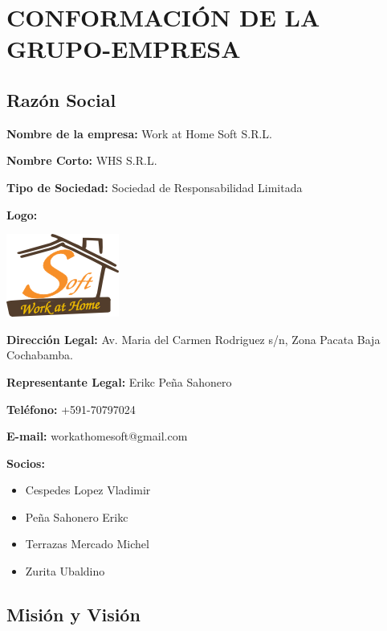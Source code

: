 \documentclass[11pt,letterpaper]{report}
\begin{document}
\chapter{CONFORMACI\'ON DE LA GRUPO-EMPRESA}
\section{Raz\'on Social}
\begin{description}
\item {\bf Nombre de la empresa: } Work at Home Soft S.R.L.
\item {\bf Nombre Corto: } WHS S.R.L.
\item {\bf Tipo de Sociedad: } Sociedad de Responsabilidad Limitada
\item {\bf Logo: } 
\begin{center}
\includegraphics{img/logo.png}
\end{center}
\item {\bf Direcci\'on Legal: } Av. Maria del Carmen Rodriguez s/n, Zona Pacata Baja Cochabamba.
\item {\bf Representante Legal: } Erikc Pe\~na Sahonero 
\item {\bf Tel\'efono: } +591-70797024
\item {\bf E-mail: } workathomesoft@gmail.com
\item {\bf Socios: } 
\begin{itemize}
\item Cespedes Lopez Vladimir
\item Pe\~na Sahonero Erikc
\item Terrazas Mercado Michel
\item Zurita Ubaldino
\end{itemize}
\end{description}
\section{Misi\'on y Visi\'on }
\end{document}
